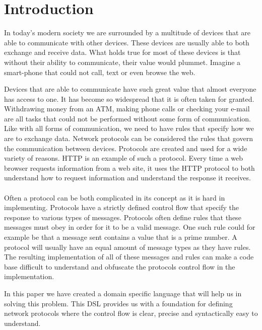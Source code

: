 \section{Introduction}
In today's modern society we are surrounded by a multitude of devices that are able to communicate with other devices. These devices are usually able to both exchange and receive data. What holds true for most of these devices is that without their ability to communicate, their value would plummet. Imagine a smart-phone that could not call, text or even browse the web. 

Devices that are able to communicate have such great value that almost everyone has access to one. It has become so widespread that it is often taken for granted. Withdrawing money from an ATM, making phone calls or checking your e-mail are all tasks that could not be performed without some form of communication. Like with all forms of communication, we need to have rules that specify how we are to exchange data. Network protocols can be considered the rules that govern the communication between devices. Protocols are created and used for a wide variety of reasons. HTTP \cite{fielding1999hypertext} is an example of such a protocol. Every time a web browser requests information from a web site, it uses the HTTP protocol to both understand how to request information and understand the response it receives.   
\\\\
Often a protocol can be both complicated in its concept as it is hard in implementing. Protocols have a strictly defined control flow that specify the response to various types of messages. Protocols often define rules that these messages must obey in order for it to be a valid message. One such rule could for example be that a message sent contains a value that is a prime number. A protocol will usually have an equal amount of message types as they have rules. The resulting implementation of all of these messages and rules can make a code base difficult to understand and obfuscate the protocols control flow in the implementation.

In this paper we have created a domain specific language that will help us in solving this problem. This DSL provides us with a foundation for defining network protocols where the control flow is clear, precise and syntactically easy to understand. 

